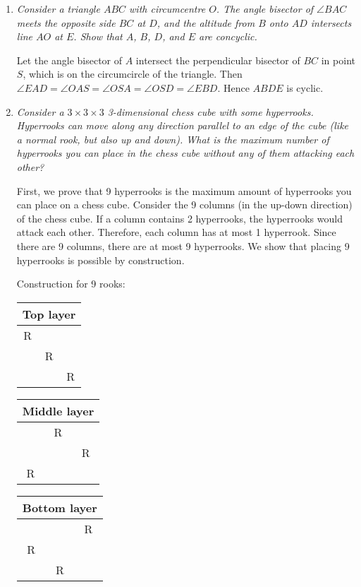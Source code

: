 \documentclass{article}
\begin{document}
\begin{enumerate}[1.]
\item %
{\itshape Consider a triangle $ABC$ with circumcentre $O$.
The angle bisector of $\angle BAC$ meets the opposite side $BC$ at $D$, and the altitude from $B$ onto $AD$ intersects line $AO$ at $E$.
Show that $A$, $B$, $D$, and $E$ are concyclic.}

Let the angle bisector of $A$ intersect the perpendicular bisector of $BC$ in point $S$, which is on the circumcircle of the triangle. Then $\angle EAD = \angle OAS = \angle OSA = \angle OSD = \angle EBD$. Hence $ABDE$ is cyclic.



\item %
{\itshape Consider a $3\times3\times3$ 3-dimensional chess cube with some hyperrooks.
Hyperrooks can move along any direction parallel to an edge of the cube (like a normal rook, but also up and down).
What is the maximum number of hyperrooks you can place in the chess cube without any of them attacking each other?}

First, we prove that 9 hyperrooks is the maximum amount of hyperrooks you can place on a chess cube. Consider the 9 columns (in the up-down direction) of the chess cube. If a column contains 2 hyperrooks, the hyperrooks would attack each other. Therefore, each column has at most 1 hyperrook. Since there are 9 columns, there are at most 9 hyperrooks. We show that placing 9 hyperrooks is possible by construction.

Construction for 9 rooks:
\begin{table}[h]
\centering
\begin{tabular}{| c | c| c |}
\multicolumn{3}{c}{Top layer}\\
\hline
R& &\\
\hline
&R&\\
\hline
&&R\\
\hline
\end{tabular}
\quad
\begin{tabular}{| c | c| c |}
\multicolumn{3}{c}{Middle layer}\\
\hline
&R &\\
\hline
&&R\\
\hline
R&&\\
\hline
\end{tabular}
\quad
\begin{tabular}{| c | c| c |}
\multicolumn{3}{c}{Bottom layer}\\
\hline
& &R\\
\hline
R&&\\
\hline
&R&\\
\hline
\end{tabular}
\end{table}


\end{enumerate}
\end{document}
